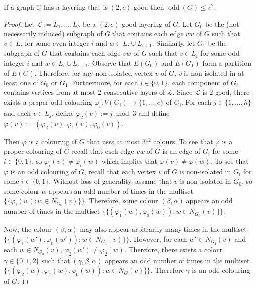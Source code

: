 \documentclass{patmorin}
\DeclareMathOperator{\odd}{odd}
\begin{document}
\begin{lem}
  If a graph $G$ has a layering that is $(2,c)$-good then $\odd(G)\le c^2$.
\end{lem}

\begin{proof}
  Let $\mathcal{L}:=L_1,\ldots,L_h$ be a $(2,c)$-good layering of $G$.  Let $G_0$ be the (not necessarily induced) subgraph of $G$ that contains each edge $vw$ of $G$ such that $v\in L_i$ for some even integer $i$ and $w\in L_i\cup L_{i+1}$.  Similarly, let $G_1$ be the subgraph of $G$ that contains each edge $vw$ of $G$ such that $v\in L_i$ for some odd integer $i$ and $w\in L_i\cup L_{i+1}$.  Observe that $E(G_0)$ and $E(G_1)$ form a partition of $E(G)$.  Therefore, for any non-isolated vertex $v$ of $G$, $v$ is non-isolated in at least one of $G_0$ or $G_1$.  Furthermore, for each $i\in\{0,1\}$, each component of $G_i$ contains vertices from at most $2$ consecutive layers of $\mathcal{L}$.  Since $\mathcal{L}$ is $2$-good, there exists a proper odd colouring $\varphi_i:V(G_i)\to\{1,\ldots,c\}$ of $G_i$.  For each $j\in\{1,\ldots,h\}$ and each $v\in L_j$, define $\varphi_2(v):= j\bmod 3$ and define $\varphi(v):=(\varphi_2(v),\varphi_1(v),\varphi_0(v))$. 
  
  Then $\varphi$ is a colouring of $G$ that uses at most $3c^2$ colours.  To see that $\varphi$ is a proper colouring of $G$ recall that each edge $vw$ of $G$ is an edge of $G_i$ for some $i\in\{0,1\}$, so $\varphi_i(v)\neq\varphi_i(w)$ which implies that $\varphi(v)\neq\varphi(w)$.  To see that $\varphi$ is an odd colouring of $G$, recall that each vertex $v$ of $G$ is non-isolated in $G_i$ for some $i\in\{0,1\}$.  Without loss of generality, assume that $v$ is non-isolated in $G_0$, so some colour $\alpha$ appears an odd number of times in the multiset $\{\{\varphi_i(w):w\in N_{G_0}(v)\}\}$. Therefore, some colour $(\beta,\alpha)$ appears an odd number of times in the multiset $\{\{(\varphi_1(w),\varphi_{0}(w)):w\in N_{G_0}(v)\}\}$.
  
  Now, the colour $(\beta,\alpha)$ may also appear arbitrarily many times in the multiset $\{\{(\varphi_1(w'),\varphi_{0}(w')):w\in N_{G_{1}}(v)\}\}$.  However, for each $w'\in N_{G_{1}}(v)$ and each $w\in N_{G_0}(v)$, $\varphi_2(w')\neq \varphi_2(w)$.  Therefore, there exists a colour $\gamma\in\{0,1,2\}$ such that $(\gamma,\beta,\alpha)$ appears an odd number of times in the multiset $\{\{(\varphi_2(w),\varphi_1(w),\varphi_{0}(w)):w\in N_{G}(v)\}\}$.  Therefore $\gamma$ is an odd colouring of $G$.
\end{proof}
\end{document}
